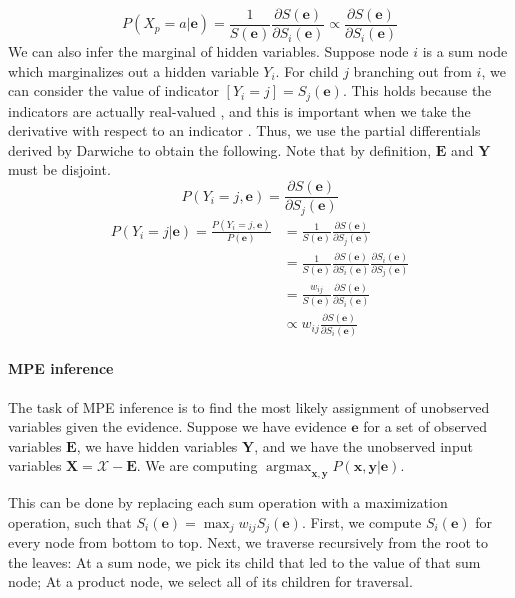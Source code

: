\documentclass[11pt, titlepage]{article}
\theoremstyle{definition}
\newcommand\mb{\mathbf}
\DeclareMathOperator*{\argmax}{argmax}
\begin{document}
\begin{equation}
P(X_p=a|\mb{e})=\frac{1}{S(\mb{e})}\frac{\partial S(\mb{e})}{\partial S_i(\mb{e})}\propto\frac{\partial S(\mb{e})}{\partial S_i(\mb{e})}
\end{equation}
We can also infer the marginal of hidden variables. Suppose node $i$ is a sum node which marginalizes out a hidden variable $Y_i$. For child $j$ branching out from $i$, we can consider the value of indicator $[Y_i=j] = S_j(\mb{e})$. This holds because the indicators are actually real-valued \cite{darwiche2003differential}\cite{peharz2015theoretical}, and this is important when we take the derivative with respect to an indicator \cite{peharz2015theoretical}. Thus, we use the partial differentials derived by Darwiche \cite{darwiche2003differential} to obtain the following. Note that by definition, $\mb{E}$ and $\mb{Y}$ must be disjoint.
\begin{equation}\label{eq:pyi}
P(Y_i=j, \mb{e})=\frac{\partial S(\mb{e})}{\partial S_j(\mb{e})}
\end{equation}
\begin{equation}
  \begin{aligned}
    P(Y_i=j|\mb{e})= \frac{P(Y_i=j, \mb{e})}{P(\mb{e})} &= \frac{1}{S(\mb{e})}\frac{\partial S(\mb{e})}{\partial S_j(\mb{e})}\\
    &= \frac{1}{S(\mb{e})}\frac{\partial S(\mb{e})}{\partial S_i(\mb{e})}\frac{\partial S_i(\mb{e})}{\partial S_j(\mb{e})}\\
    &=\frac{w_{ij}}{S(\mb{e})}\frac{\partial S(\mb{e})}{\partial S_i(\mb{e})}\\
    &\propto w_{ij}\frac{\partial S(\mb{e})}{\partial S_i(\mb{e})}
  \end{aligned}
\end{equation}


\paragraph{MPE inference}\label{if:map}
The task of MPE inference is to find the most likely assignment of unobserved variables given the evidence. Suppose we have evidence $\mb{e}$ for a set of observed variables $\mb{E}$, we have hidden variables $\mb{Y}$, and we have the unobserved input variables $\mb{X}=\mathcal{X}-\mb{E}$. We are computing $\argmax_{\mb{x},\mb{y}}P(\mb{x},\mb{y}|\mb{e})$.


This can be done by replacing each sum operation with a maximization operation, such that $S_i(\mb{e})=\max_{j}w_{ij}S_j(\mb{e})$. First, we compute $S_i(\mb{e})$ for every node from bottom to top. Next, we traverse recursively from the root to the leaves: At a sum node, we pick its child that led to the value of that sum node; At a product node, we select all of its children for traversal. 
\end{document}
